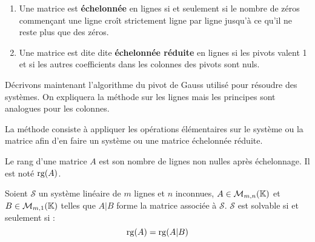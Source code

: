 \begin{definition}
	\begin{enumerate}
		\item Une matrice est \textbf{échelonnée} en lignes si et seulement si le nombre de zéros commençant une ligne croît strictement ligne par ligne jusqu'à ce qu'il ne reste plus que des zéros.
		\item Une matrice est dite dite \textbf{échelonnée réduite} en lignes si les pivots valent 1 et si les autres coefficients dans les colonnes des pivots sont nuls.
	\end{enumerate}
\end{definition}

\par Décrivons maintenant l'algorithme du pivot de Gauss utilisé pour résoudre des systèmes. On expliquera la méthode sur les lignes mais les principes sont analogues pour les colonnes.
\par \noindent La méthode consiste à appliquer les opérations élémentaires sur le système ou la matrice afin d'en faire un système ou une matrice échelonnée réduite.

\begin{definition}
	Le rang d'une matrice $A$ est son nombre de lignes non nulles après échelonnage. Il est noté $\operatorname{rg}(A)$.
\end{definition}

\begin{theorem}
    Soient $\mathcal{S}$ un système linéaire de $m$ lignes et $n$ inconnues, $A \in \mathcal{M}_{m,n}(\mathbb{K})$ et $B \in \mathcal{M}_{m,1}(\mathbb{K})$ telles que $A|B$ forme la matrice associée à $\mathcal{S}$. $\mathcal{S}$ est solvable si et seulement si :
    \[ \operatorname{rg}(A) = \operatorname{rg}(A|B) \]
\end{theorem}

